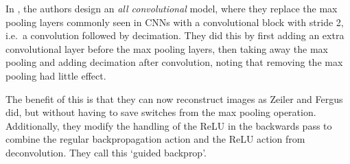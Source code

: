   In \cite{springenberg_striving_2014-3}, the authors design an \emph{all convolutional} model,
  where they replace the max pooling layers commonly seen in CNNs with a
  convolutional block with stride 2, i.e.\ a convolution followed by decimation.
  They did this by first adding an extra convolutional layer before the max
  pooling layers, then taking away the max pooling and adding decimation after
  convolution, noting that removing the max pooling had little effect.

  The benefit of this is that they can now reconstruct images as Zeiler and
  Fergus did, but without having to save switches from the max pooling
  operation. Additionally, they modify the handling of the ReLU in the
  backwards pass to combine the regular backpropagation action and the ReLU
  action from deconvolution. They call this `guided backprop'.

